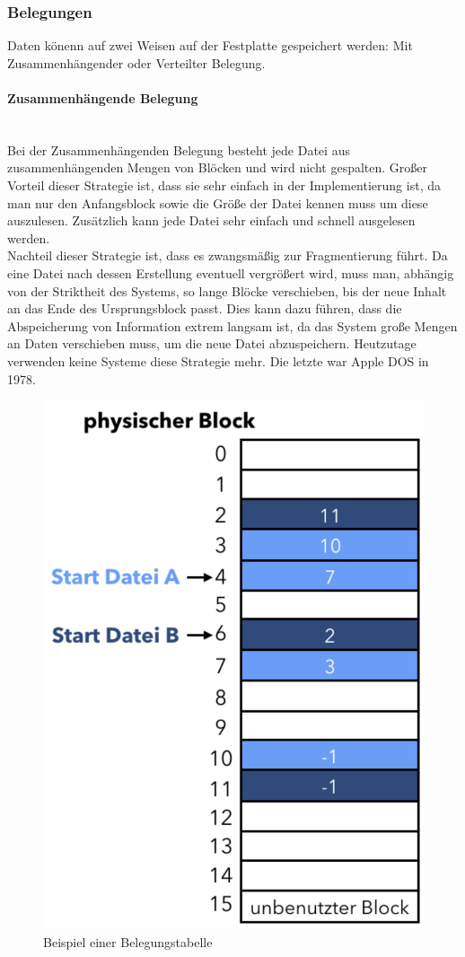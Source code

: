 \documentclass{article}
\newcommand{\paragraphlb}[1]{\paragraph{#1}\mbox{}\\}
\begin{document}
	\subsubsection{Belegungen}
	Daten könenn auf zwei Weisen auf der Festplatte gespeichert werden: Mit Zusammenhängender oder Verteilter Belegung. 
	\paragraphlb{Zusammenhängende Belegung}
	Bei der Zusammenhängenden Belegung besteht jede Datei aus zusammenhängenden Mengen von Blöcken und wird nicht gespalten. Großer Vorteil dieser Strategie ist, dass sie sehr einfach in der Implementierung ist, da man nur den Anfangsblock sowie die Größe der Datei kennen muss um diese auszulesen. Zusätzlich kann jede Datei sehr einfach und schnell ausgelesen werden. \\
	Nachteil dieser Strategie ist, dass es zwangsmäßig zur Fragmentierung führt. Da eine Datei nach dessen Erstellung eventuell vergrößert wird, muss man, abhängig von der Striktheit des Systems, so lange Blöcke verschieben, bis der neue Inhalt an das Ende des Ursprungsblock passt. Dies kann dazu führen, dass die Abspeicherung von Information extrem langsam ist, da das System große Mengen an Daten verschieben muss, um die neue Datei abzuspeichern. Heutzutage verwenden keine Systeme diese Strategie mehr. Die letzte war Apple DOS in 1978. \\
	\begin{figure}
		\begin{center}
		\includegraphics[scale=0.4]{Bilder/fat.png}
		\caption{Beispiel einer Belegungstabelle}
		\end{center}
	\end{figure}
\end{document}
